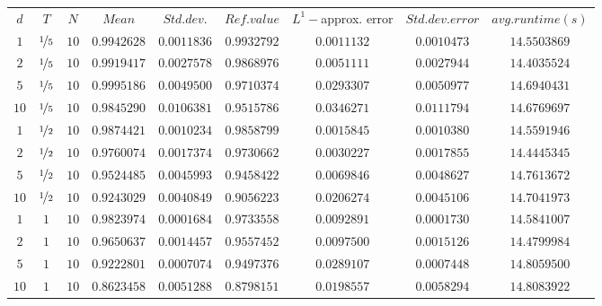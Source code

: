 \begin{tabular}{ccccccccc}
$d$ & $T$ & $N$ & $Mean$ & $Std. dev.$ & $Ref. value$ & $L^1-$approx. error & $Std. dev. error$ & $avg. runtime (s)$\\
$1$ & $\nicefrac{1}{5}$ & $10$ & $0.9942628$ & $0.0011836$ & $0.9932792$ & $0.0011132$ & $0.0010473$ & $14.5503869$\\
$2$ & $\nicefrac{1}{5}$ & $10$ & $0.9919417$ & $0.0027578$ & $0.9868976$ & $0.0051111$ & $0.0027944$ & $14.4035524$\\
$5$ & $\nicefrac{1}{5}$ & $10$ & $0.9995186$ & $0.0049500$ & $0.9710374$ & $0.0293307$ & $0.0050977$ & $14.6940431$\\
$10$ & $\nicefrac{1}{5}$ & $10$ & $0.9845290$ & $0.0106381$ & $0.9515786$ & $0.0346271$ & $0.0111794$ & $14.6769697$\\
$1$ & $\nicefrac{1}{2}$ & $10$ & $0.9874421$ & $0.0010234$ & $0.9858799$ & $0.0015845$ & $0.0010380$ & $14.5591946$\\
$2$ & $\nicefrac{1}{2}$ & $10$ & $0.9760074$ & $0.0017374$ & $0.9730662$ & $0.0030227$ & $0.0017855$ & $14.4445345$\\
$5$ & $\nicefrac{1}{2}$ & $10$ & $0.9524485$ & $0.0045993$ & $0.9458422$ & $0.0069846$ & $0.0048627$ & $14.7613672$\\
$10$ & $\nicefrac{1}{2}$ & $10$ & $0.9243029$ & $0.0040849$ & $0.9056223$ & $0.0206274$ & $0.0045106$ & $14.7041973$\\
$1$ & $1$ & $10$ & $0.9823974$ & $0.0001684$ & $0.9733558$ & $0.0092891$ & $0.0001730$ & $14.5841007$\\
$2$ & $1$ & $10$ & $0.9650637$ & $0.0014457$ & $0.9557452$ & $0.0097500$ & $0.0015126$ & $14.4799984$\\
$5$ & $1$ & $10$ & $0.9222801$ & $0.0007074$ & $0.9497376$ & $0.0289107$ & $0.0007448$ & $14.8059500$\\
$10$ & $1$ & $10$ & $0.8623458$ & $0.0051288$ & $0.8798151$ & $0.0198557$ & $0.0058294$ & $14.8083922$\\
\end{tabular}
